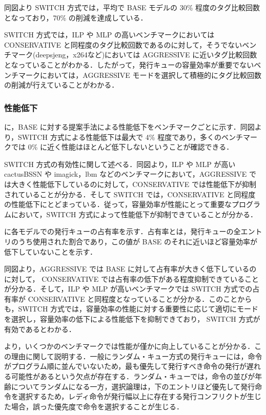 同図より SWITCH 方式では，平均で BASE モデルの 30\% 程度のタグ比較回数となっており，70\% の削減を達成している．

SWITCH 方式では，ILP や MLP の高いベンチマークにおいてはCONSERVATIVE と同程度のタグ比較回数であるのに対して，そうでないベンチマーク(deepsjeng，x264など)においては AGGRESSIVE に近いタグ比較回数となっていることがわかる．したがって，発行キューの容量効率が重要でないベンチマークにおいては，AGGRESSIVE モードを選択して積極的にタグ比較回数の削減が行えていることがわかる．

\subsubsection{性能低下}
に，BASE に対する提案手法による性能低下をベンチマークごとに示す．同図より，SWITCH 方式による性能低下は最大で 4\% 程度であり，多くのベンチマークでは 0\% に近く性能はほとんど低下しないということが確認できる．

SWITCH 方式の有効性に関して述べる．同図より，ILP や MLP が高い cactusBSSN や imagick，lbm などのベンチマークにおいて，AGGRESSIVE では大きく性能低下しているのに対して，CONSERVATIVE では性能低下が抑制されていることが分かる．そして SWITCH では，CONSERVATIVE と同程度の性能低下にとどまっている．従って，容量効率が性能にとって重要なプログラムにおいて，SWITCH 方式によって性能低下が抑制できていることが分かる．

に各モデルでの発行キューの占有率を示す．占有率とは，発行キューの全エントリのうち使用された割合であり，この値が BASE のそれに近いほど容量効率が低下していないことを示す．

同図より，AGGRESSIVE では BASE に対して占有率が大きく低下しているのに対して， CONSERVATIVE では占有率の低下がある程度抑制できていることが分かる．そして，ILP や MLP が高いベンチマークでは SWITCH 方式での占有率が CONSERVATIVE と同程度となっていることが分かる．このことからも，SWITCH 方式では，容量効率の性能に対する重要性に応じて適切にモードを選択し，容量効率の低下による性能低下を抑制できており， SWITCH 方式が有効であるとわかる．

より，いくつかのベンチマークでは性能が僅かに向上していることが分かる．この理由に関して説明する．一般にランダム・キュー方式の発行キューには，命令がプログラム順に並んでいないため，最も優先して発行すべき命令の発行が遅れる可能性があるという欠点が存在する．ランダム・キューでは，命令の並びが年齢についてランダムになる一方，選択論理は，下のエントリほど優先して発行命令を選択するため，レディ命令が発行幅以上に存在する発行コンフリクトが生じた場合，誤った優先度で命令を選択することが生じる．

